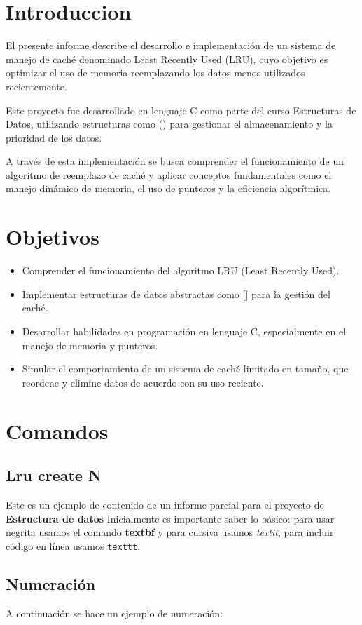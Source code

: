 
\section{Introduccion}
El presente informe describe el desarrollo e implementación de un sistema de manejo de caché denominado Least Recently Used (LRU), cuyo objetivo es optimizar el uso de memoria reemplazando los datos menos utilizados recientemente.

Este proyecto fue desarrollado en lenguaje C como parte del curso Estructuras de Datos, utilizando estructuras como () para gestionar el almacenamiento y la prioridad de los datos.

A través de esta implementación se busca comprender el funcionamiento de un algoritmo de reemplazo de caché y aplicar conceptos fundamentales como el manejo dinámico de memoria, el uso de punteros y la eficiencia algorítmica.
\newpage
\section{Objetivos}
\begin{itemize}
    \item Comprender el funcionamiento del algoritmo LRU (Least Recently Used).
    \item Implementar estructuras de datos abstractas como [] para la gestión del caché.
    \item Desarrollar habilidades en programación en lenguaje C, especialmente en el manejo de memoria y punteros.
    \item Simular el comportamiento de un sistema de caché limitado en tamaño, que reordene y elimine datos de acuerdo con su uso reciente.
\end{itemize}
\newpage
\section{Comandos}
\subsection{Lru create N}
Este es un ejemplo de contenido de un informe parcial para el proyecto de \textbf{Estructura de datos}
Inicialmente es importante saber lo básico: para usar negrita usamos el comando \textbf{textbf} y para cursiva usamos \textit{textit}, para incluir código en línea usamos \texttt{texttt}.

\subsection{Numeración} %
A continuación se hace un ejemplo de numeración:

